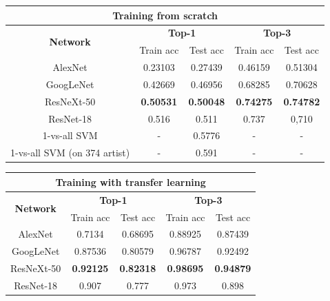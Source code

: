 \documentclass{article}
\begin{document}

\begin{table}[]
	\begin{tabular}{|c|c|c|c|c|}
		\hline
		\multicolumn{5}{|c|}{\textbf{Training from scratch}}                                                          \\ \hline
		\multirow{2}{*}{\textbf{Network}} & \multicolumn{2}{c|}{\textbf{Top-1}} & \multicolumn{2}{c|}{\textbf{Top-3}} \\ \cline{2-5} 
		& Train acc        & Test acc         & Train acc        & Test acc         \\ \hline
		AlexNet                           & 0.23103          & 0.27439          & 0.46159          & 0.51304          \\ \hline
		GoogLeNet                         & 0.42669          & 0.46956          & 0.68285          & 0.70628          \\ \hline
		ResNeXt-50                        & \textbf{0.50531} & \textbf{0.50048} & \textbf{0.74275} & \textbf{0.74782} \\ \hline
		ResNet-18 \cite{ArtistIdCNN406}                    & 0.516            & 0.511            & 0.737            & 0,710            \\ \hline
		1-vs-all SVM \cite{Saleh2015}                    & -            & 0.5776            &    -         & -            \\ \hline
		1-vs-all SVM (on 374 artist) \cite{mensink2014}                  & -            & 0.591            &    -         & -            \\ \hline
	\end{tabular}
	\begin{tabular}{|c|c|c|c|c|}
		\hline
		\multicolumn{5}{|c|}{\textbf{Training with transfer learning}}                                                           \\ \hline
		\multirow{2}{*}{\textbf{Network}} & \multicolumn{2}{c|}{\textbf{Top-1}}  & \multicolumn{2}{c|}{\textbf{Top-3}} \\ \cline{2-5} 
		& Train acc        & Test acc          & Train acc         & Test acc        \\ \hline
		AlexNet                           & 0.7134           & 0.68695           & 0.88925           & 0.87439         \\ \hline
		GoogLeNet                         & 0.87536          & 0.80579           & 0.96787           & 0.92492         \\ \hline
		ResNeXt-50                        & \textbf{0.92125} & \textbf{0.82318} & \textbf{0.98695}  & \textbf{0.94879} \\ \hline
		ResNet-18 \cite{ArtistIdCNN406}                    & 0.907            & 0.777             & 0.973             & 0.898           \\ \hline
	\end{tabular}
	\label{table}
\end{table}
\end{document}
